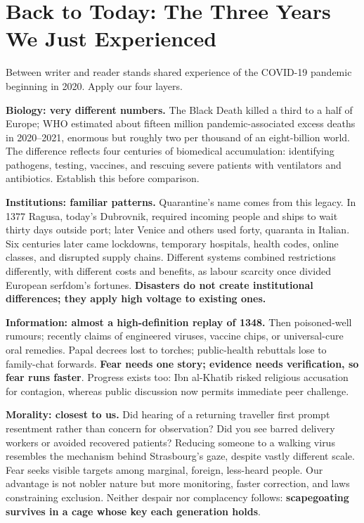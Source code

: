 \section[Back to Today: The Pandemic Years]{Back to Today: The Three Years We Just Experienced}
Between writer and reader stands shared experience of the COVID-19 pandemic beginning in 2020. Apply our four layers.

\textbf{Biology: very different numbers.} The Black Death killed a third to a half of Europe; WHO estimated about fifteen million pandemic-associated excess deaths in 2020--2021, enormous but roughly two per thousand of an eight-billion world. The difference reflects four centuries of biomedical accumulation: identifying pathogens, testing, vaccines, and rescuing severe patients with ventilators and antibiotics. Establish this before comparison.

\textbf{Institutions: familiar patterns.} Quarantine's name comes from this legacy. In 1377 Ragusa, today's Dubrovnik, required incoming people and ships to wait thirty days outside port; later Venice and others used forty, quaranta in Italian. Six centuries later came lockdowns, temporary hospitals, health codes, online classes, and disrupted supply chains. Different systems combined restrictions differently, with different costs and benefits, as labour scarcity once divided European serfdom's fortunes. \textbf{Disasters do not create institutional differences; they apply high voltage to existing ones.}

\textbf{Information: almost a high-definition replay of 1348.} Then poisoned-well rumours; recently claims of engineered viruses, vaccine chips, or universal-cure oral remedies. Papal decrees lost to torches; public-health rebuttals lose to family-chat forwards. \textbf{Fear needs one story; evidence needs verification, so fear runs faster}. Progress exists too: Ibn al-Khatib risked religious accusation for contagion, whereas public discussion now permits immediate peer challenge.

\textbf{Morality: closest to us.} Did hearing of a returning traveller first prompt resentment rather than concern for observation? Did you see barred delivery workers or avoided recovered patients? Reducing someone to a walking virus resembles the mechanism behind Strasbourg's gaze, despite vastly different scale. Fear seeks visible targets among marginal, foreign, less-heard people. Our advantage is not nobler nature but more monitoring, faster correction, and laws constraining exclusion. Neither despair nor complacency follows: \textbf{scapegoating survives in a cage whose key each generation holds}.

